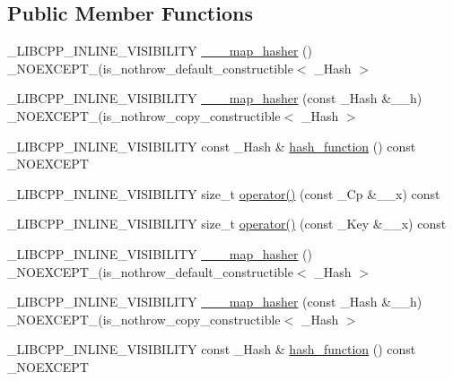 \subsection*{Public Member Functions}
\begin{DoxyCompactItemize}
\item 
\+\_\+\+L\+I\+B\+C\+P\+P\+\_\+\+I\+N\+L\+I\+N\+E\+\_\+\+V\+I\+S\+I\+B\+I\+L\+I\+T\+Y \hyperlink{class______map__hasher_aaefe1bf01439916eaea11e4c6d7cd17b}{\+\_\+\+\_\+\+\_\+map\+\_\+hasher} () \+\_\+\+N\+O\+E\+X\+C\+E\+P\+T\+\_\+(is\+\_\+nothrow\+\_\+default\+\_\+constructible$<$ \+\_\+\+Hash $>$
\item 
\+\_\+\+L\+I\+B\+C\+P\+P\+\_\+\+I\+N\+L\+I\+N\+E\+\_\+\+V\+I\+S\+I\+B\+I\+L\+I\+T\+Y \hyperlink{class______map__hasher_ac4db69e3ab386b85e68bca517344fb2c}{\+\_\+\+\_\+\+\_\+map\+\_\+hasher} (const \+\_\+\+Hash \&\+\_\+\+\_\+h) \+\_\+\+N\+O\+E\+X\+C\+E\+P\+T\+\_\+(is\+\_\+nothrow\+\_\+copy\+\_\+constructible$<$ \+\_\+\+Hash $>$
\item 
\+\_\+\+L\+I\+B\+C\+P\+P\+\_\+\+I\+N\+L\+I\+N\+E\+\_\+\+V\+I\+S\+I\+B\+I\+L\+I\+T\+Y const \+\_\+\+Hash \& \hyperlink{class______map__hasher_a3bf000307ccac15d6fc1886aa5c390fd}{hash\+\_\+function} () const \+\_\+\+N\+O\+E\+X\+C\+E\+P\+T
\item 
\+\_\+\+L\+I\+B\+C\+P\+P\+\_\+\+I\+N\+L\+I\+N\+E\+\_\+\+V\+I\+S\+I\+B\+I\+L\+I\+T\+Y size\+\_\+t \hyperlink{class______map__hasher_a9536e86762187c3325bf995d816e17c5}{operator()} (const \+\_\+\+Cp \&\+\_\+\+\_\+x) const 
\item 
\+\_\+\+L\+I\+B\+C\+P\+P\+\_\+\+I\+N\+L\+I\+N\+E\+\_\+\+V\+I\+S\+I\+B\+I\+L\+I\+T\+Y size\+\_\+t \hyperlink{class______map__hasher_a38b257204597204eff179858e61a00d9}{operator()} (const \+\_\+\+Key \&\+\_\+\+\_\+x) const 
\item 
\+\_\+\+L\+I\+B\+C\+P\+P\+\_\+\+I\+N\+L\+I\+N\+E\+\_\+\+V\+I\+S\+I\+B\+I\+L\+I\+T\+Y \hyperlink{class______map__hasher_aaefe1bf01439916eaea11e4c6d7cd17b}{\+\_\+\+\_\+\+\_\+map\+\_\+hasher} () \+\_\+\+N\+O\+E\+X\+C\+E\+P\+T\+\_\+(is\+\_\+nothrow\+\_\+default\+\_\+constructible$<$ \+\_\+\+Hash $>$
\item 
\+\_\+\+L\+I\+B\+C\+P\+P\+\_\+\+I\+N\+L\+I\+N\+E\+\_\+\+V\+I\+S\+I\+B\+I\+L\+I\+T\+Y \hyperlink{class______map__hasher_ac4db69e3ab386b85e68bca517344fb2c}{\+\_\+\+\_\+\+\_\+map\+\_\+hasher} (const \+\_\+\+Hash \&\+\_\+\+\_\+h) \+\_\+\+N\+O\+E\+X\+C\+E\+P\+T\+\_\+(is\+\_\+nothrow\+\_\+copy\+\_\+constructible$<$ \+\_\+\+Hash $>$
\item 
\+\_\+\+L\+I\+B\+C\+P\+P\+\_\+\+I\+N\+L\+I\+N\+E\+\_\+\+V\+I\+S\+I\+B\+I\+L\+I\+T\+Y const \+\_\+\+Hash \& \hyperlink{class______map__hasher_a3bf000307ccac15d6fc1886aa5c390fd}{hash\+\_\+function} () const \+\_\+\+N\+O\+E\+X\+C\+E\+P\+T

\end{DoxyCompactItemize}
